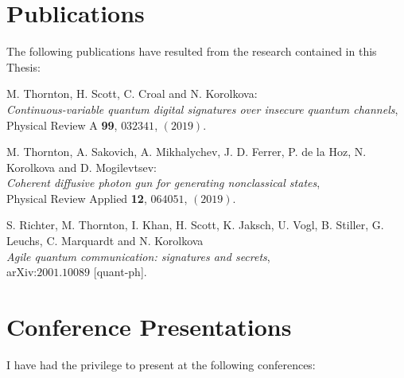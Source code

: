 \chapter*{\hfill Publications}


The following publications have resulted from the research contained in this Thesis:

\vspace{0.5in}
\begin{minipage}{\linewidth}
M. Thornton, H. Scott, C. Croal and N. Korolkova: \\
\emph{Continuous-variable quantum digital signatures over insecure quantum channels}, \\
Physical Review A \textbf{99}, $032341$, $\left(2019\right)$.
\end{minipage}

\vspace{0.25in}
\begin{minipage}{\linewidth}
M. Thornton, A. Sakovich, A. Mikhalychev, J. D. Ferrer, P. de la Hoz, N. Korolkova and D. Mogilevtsev: \\
\emph{Coherent diffusive photon gun for generating nonclassical states}, \\
Physical Review Applied \textbf{12}, $064051$, $\left(2019\right)$.
\end{minipage}

\vspace{0.25in}
\begin{minipage}{\linewidth}
S. Richter, M. Thornton, I. Khan, H. Scott, K. Jaksch, U. Vogl, B. Stiller, G. Leuchs, C. Marquardt and N. Korolkova \\
\emph{Agile quantum communication: signatures and secrets}, \\
arXiv:$2001.10089$ [quant-ph].
\end{minipage}



\chapter*{\hfill Conference Presentations}
I have had the privilege to present at the following conferences:


